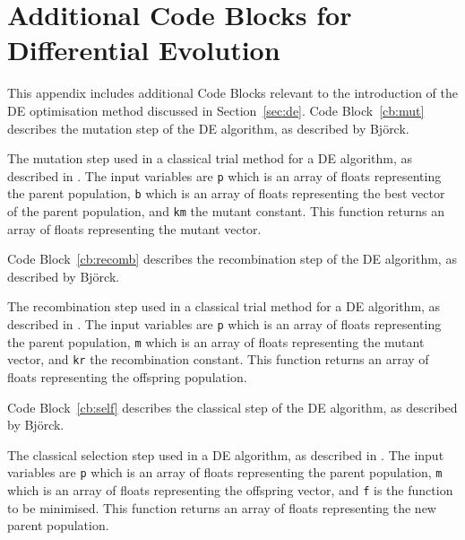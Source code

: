 \chapter{Additional Code Blocks for Differential Evolution} %

\label{diff_evo_app} %

This appendix includes additional Code Blocks relevant to the introduction of the DE optimisation method discussed in Section~\ref{sec:de}.
Code Block~\ref{cb:mut} describes the mutation step of the DE algorithm, as described by Bj\"{o}rck.\autocite{bjorck_fitting_2011}
%
\begin{listing}
    \centering
    \caption{The mutation step used in a classical trial method for a DE algorithm, as described in \cite{bjorck_fitting_2011}. The input variables are \texttt{p} which is an array of floats representing the parent population, \texttt{b} which is an array of floats representing the best vector of the parent population, and \texttt{km} the mutant constant. This function returns an array of floats representing the mutant vector.}
    
    \label{cb:mut}
\end{listing}
%
Code Block~\ref{cb:recomb} describes the recombination step of the DE algorithm, as described by Bj\"{o}rck.\autocite{bjorck_fitting_2011}
%
\begin{listing}
    \centering
    \caption{The recombination step used in a classical trial method for a DE algorithm, as described in \cite{bjorck_fitting_2011}. The input variables are \texttt{p} which is an array of floats representing the parent population, \texttt{m} which is an array of floats representing the mutant vector, and \texttt{kr} the recombination constant. This function returns an array of floats representing the offspring population.}
    
    \label{cb:recomb}
\end{listing}
%
Code Block~\ref{cb:self} describes the classical step of the DE algorithm, as described by Bj\"{o}rck.\autocite{bjorck_fitting_2011}
%
\begin{listing}
    \centering
    \caption{The classical selection step used in a DE algorithm, as described in \cite{bjorck_fitting_2011}. The input variables are \texttt{p} which is an array of floats representing the parent population, \texttt{m} which is an array of floats representing the offspring vector, and \texttt{f} is the function to be minimised. This function returns an array of floats representing the new parent population.}
    
    \label{cb:sel}
\end{listing}
%
